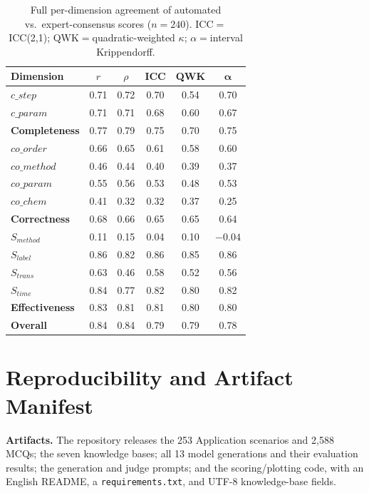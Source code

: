\documentclass[conference]{IEEEtran}
\begin{document}
\begin{table}[htbp]
    \centering
    \caption{Full per-dimension agreement of automated vs.\ expert-consensus
    scores ($n{=}240$). ICC${=}$ICC(2,1); QWK${=}$quadratic-weighted $\kappa$;
    $\alpha{=}$interval Krippendorff.}
    \label{tab:calibfull}
    \small
    \begin{tabular}{l c c c c c}
        \toprule
        \textbf{Dimension} & $r$ & $\rho$ & \textbf{ICC} & \textbf{QWK} & $\boldsymbol{\alpha}$ \\
        \midrule
        $c\_step$  & 0.71 & 0.72 & 0.70 & 0.54 & 0.70 \\
        $c\_param$ & 0.71 & 0.71 & 0.68 & 0.60 & 0.67 \\
        \textbf{Completeness} & 0.77 & 0.79 & 0.75 & 0.70 & 0.75 \\
        \midrule
        $co\_order$  & 0.66 & 0.65 & 0.61 & 0.58 & 0.60 \\
        $co\_method$ & 0.46 & 0.44 & 0.40 & 0.39 & 0.37 \\
        $co\_param$  & 0.55 & 0.56 & 0.53 & 0.48 & 0.53 \\
        $co\_chem$   & 0.41 & 0.32 & 0.32 & 0.37 & 0.25 \\
        \textbf{Correctness} & 0.68 & 0.66 & 0.65 & 0.65 & 0.64 \\
        \midrule
        $S_{method}$ & 0.11 & 0.15 & 0.04 & 0.10 & $-0.04$ \\
        $S_{label}$  & 0.86 & 0.82 & 0.86 & 0.85 & 0.86 \\
        $S_{trans}$  & 0.63 & 0.46 & 0.58 & 0.52 & 0.56 \\
        $S_{time}$   & 0.84 & 0.77 & 0.82 & 0.80 & 0.82 \\
        \textbf{Effectiveness} & 0.83 & 0.81 & 0.81 & 0.80 & 0.80 \\
        \midrule
        \textbf{Overall} & 0.84 & 0.84 & 0.79 & 0.79 & 0.78 \\
        \bottomrule
    \end{tabular}
\end{table}

\section{Reproducibility and Artifact Manifest}\label{app:repro}
\noindent\textbf{Artifacts.} The repository releases the 253 Application
scenarios and 2{,}588 MCQs; the seven knowledge bases; all 13 model generations
and their evaluation results; the generation and judge prompts; and the
scoring/plotting code, with an English README, a \texttt{requirements.txt}, and
UTF-8 knowledge-base fields.
\end{document}
